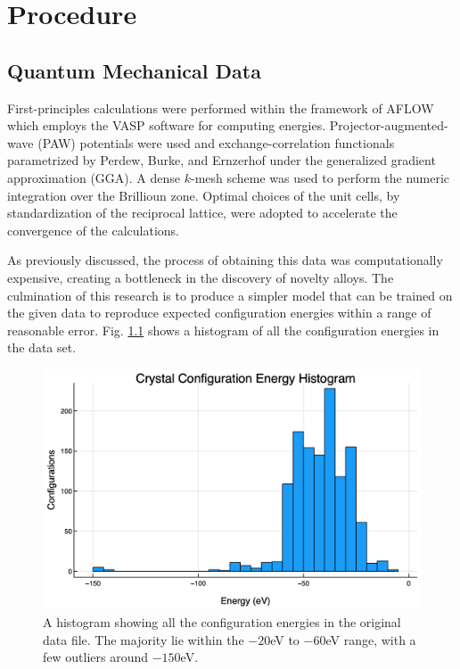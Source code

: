 \chapter{Procedure} \label{Sect:procedure}
\section{Quantum Mechanical Data}\label{Sect:procedureData}
\par First-principles calculations were performed within the framework of AFLOW\cite{} which employs the VASP software for computing energies.\cite{} Projector-augmented-wave (PAW) potentials were used and exchange-correlation functionals parametrized by Perdew, Burke, and Ernzerhof under the generalized gradient approximation (GGA)\cite{}. A dense $k$-mesh scheme was used to perform the numeric integration over the Brillioun zone\cite{}. Optimal choices of the unit cells, by standardization of the reciprocal lattice, were adopted to accelerate the convergence of the calculations.
\par As previously discussed, the process of obtaining this data was computationally expensive, creating a bottleneck in the discovery of novelty alloys. The culmination of this research is to produce a simpler model that can be trained on the given data to reproduce expected configuration energies within a range of reasonable error. Fig. \ref{histEnergy} shows a histogram of all the configuration energies in the data set.

\begin{figure}%
\centering
\includegraphics[scale = 0.4]{Figures/UnitCellEnergies}
\caption{A histogram showing all the configuration energies in the original data file. The majority lie within the $-20$eV to $-60$eV range, with a few outliers around $-150$eV.
\label{histEnergy}} 
\end{figure}

